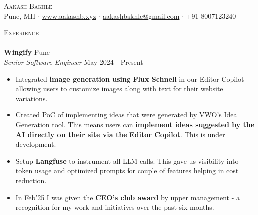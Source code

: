 \documentclass[a4paper]{article}
\newcommand{\lineunder} {
    \vspace*{-8pt} \\
    \hspace*{-18pt} \hrulefill \\
}
\newcommand{\header} [1] {
    {\hspace*{-18pt}\vspace*{6pt} \textsc{#1}}
    \vspace*{-6pt} \lineunder
}
\begin{document}
\vspace*{-40pt}



\vspace*{-10pt}
\begin{center}
    {\Huge \scshape {Aakash Bakhle}}\\
    Pune, MH $\cdot$ \href{https://www.aakashb.xyz}{www.aakashb.xyz} $\cdot$ \href{mailto:aakashbakhle@gmail.com}{aakashbakhle@gmail.com} $\cdot$ +91-8007123240 
\end{center}


\header{Experience}
\vspace{1mm}
\textbf{Wingify} \hfill Pune\\
\textit{Senior Software Engineer} \hfill May 2024 - Present\\
\vspace{-1mm}
\begin{itemize} \itemsep 1pt
    \item Integrated \textbf{image generation using Flux Schnell} in our Editor Copilot allowing users to customize images along with text for their website variations.
    \item Created PoC of implementing ideas that were generated by VWO's Idea Generation tool. This means users can \textbf{implement ideas suggested by the AI directly on their site via the Editor Copilot}. This is under development.
    \item Setup \textbf{Langfuse} to instrument all LLM calls. This gave us visibility into token usage and optimized prompts for couple of features helping in cost reduction.
    \item In Feb'25 I was given the \textbf{CEO's club award} by upper management - a recognition for my work and initiatives over the past six months. 
\end{itemize}
\end{document}
